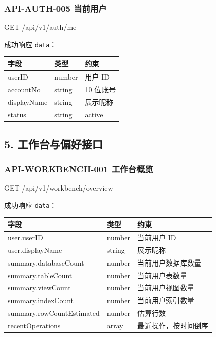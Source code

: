 \documentclass[
  a4paper,
  UTF8]{ctexart}
\newenvironment{Shaded}{}{}
\newcommand{\NormalTok}[1]{#1}
\begin{document}
\hypertarget{api-auth-005-ux5f53ux524dux7528ux6237}{%
\subsubsection{API-AUTH-005
当前用户}\label{api-auth-005-ux5f53ux524dux7528ux6237}}

\begin{Shaded}
\begin{Highlighting}[]
\NormalTok{GET /api/v1/auth/me}
\end{Highlighting}
\end{Shaded}

成功响应 \texttt{data}：

\begin{longtable}[]{@{}lll@{}}
\toprule
字段 & 类型 & 约束 \\
\midrule
\endhead
userID & number & 用户 ID \\
accountNo & string & 10 位账号 \\
displayName & string & 展示昵称 \\
status & string & active \\
\bottomrule
\end{longtable}

\hypertarget{ux5de5ux4f5cux53f0ux4e0eux504fux597dux63a5ux53e3}{%
\subsection{5.
工作台与偏好接口}\label{ux5de5ux4f5cux53f0ux4e0eux504fux597dux63a5ux53e3}}

\hypertarget{api-workbench-001-ux5de5ux4f5cux53f0ux6982ux89c8}{%
\subsubsection{API-WORKBENCH-001
工作台概览}\label{api-workbench-001-ux5de5ux4f5cux53f0ux6982ux89c8}}

\begin{Shaded}
\begin{Highlighting}[]
\NormalTok{GET /api/v1/workbench/overview}
\end{Highlighting}
\end{Shaded}

成功响应 \texttt{data}：

\begin{longtable}[]{@{}lll@{}}
\toprule
字段 & 类型 & 约束 \\
\midrule
\endhead
user.userID & number & 当前用户 ID \\
user.displayName & string & 展示昵称 \\
summary.databaseCount & number & 当前用户数据库数量 \\
summary.tableCount & number & 当前用户表数量 \\
summary.viewCount & number & 当前用户视图数量 \\
summary.indexCount & number & 当前用户索引数量 \\
summary.rowCountEstimated & number & 估算行数 \\
recentOperations & array & 最近操作，按时间倒序 \\
\bottomrule
\end{longtable}
\end{document}
